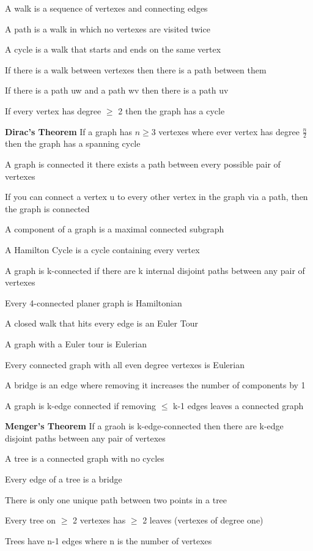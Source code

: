 \documentclass[12pt]{article}
\begin{document}
A walk is a sequence of vertexes and connecting edges

A path is a walk in which no vertexes are visited twice

A cycle is a walk that starts and ends on the same vertex

If there is a walk between vertexes then there is a path between them

If there is a path uw and a path wv then there is a path uv

If every vertex has degree $\geq$ 2 then the graph has a cycle

\textbf{Dirac's Theorem} If a graph has $n\geq 3$ vertexes where ever vertex has degree $\frac{n}{2}$ then the graph has a spanning cycle

A graph is connected it there exists a path between every possible pair of vertexes

If you can connect a vertex u to every other vertex in the graph via a path, then the graph is connected

A component of a graph is a maximal connected subgraph

A Hamilton Cycle is a cycle containing every vertex

A graph is k-connected if there are k internal disjoint paths between any pair of vertexes

Every 4-connected planer graph is Hamiltonian

A closed walk that hits every edge is an Euler Tour

A graph with a Euler tour is Eulerian

Every connected graph with all even degree vertexes is Eulerian

A bridge is an edge where removing it increases the number of components by 1

A graph is k-edge connected if removing $\leq$ k-1 edges leaves a connected graph

\textbf{Menger's Theorem} If a graoh is k-edge-connected then there are k-edge disjoint paths between any pair of vertexes

A tree is a connected graph with no cycles

Every edge of a tree is a bridge

There is only one unique path between two points in a tree

Every tree on $\geq$ 2 vertexes has $\geq$ 2 leaves (vertexes of degree one)

Trees have n-1 edges where n is the number of vertexes
\end{document}

